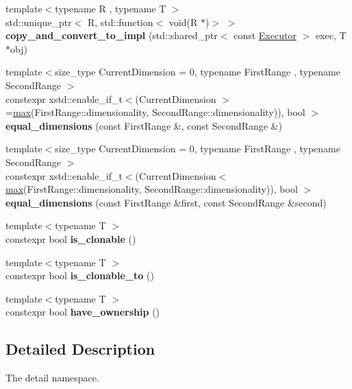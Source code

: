 \begin{DoxyCompactItemize}
{\footnotesize template$<$typename R , typename T $>$ }\\std\+::unique\+\_\+ptr$<$ R, std\+::function$<$ void(R $\ast$)$>$ $>$ {\bfseries copy\+\_\+and\+\_\+convert\+\_\+to\+\_\+impl} (std\+::shared\+\_\+ptr$<$ const \hyperlink{classgko_1_1Executor}{Executor} $>$ exec, T $\ast$obj)
\item 
\mbox{\label{namespacegko_1_1detail_a4f4f7a64773433c299781d012982d34b}} 
{\footnotesize template$<$size\+\_\+type Current\+Dimension = 0, typename First\+Range , typename Second\+Range $>$ }\\constexpr xstd\+::enable\+\_\+if\+\_\+t$<$(Current\+Dimension $>$=\hyperlink{namespacegko_af1812df45c6ec07780d579a12b64c753}{max}(First\+Range\+::dimensionality, Second\+Range\+::dimensionality)), bool $>$ {\bfseries equal\+\_\+dimensions} (const First\+Range \&, const Second\+Range \&)
\item 
\mbox{\label{namespacegko_1_1detail_a10f2b79746f4c9575b3a3ea1a330383d}} 
{\footnotesize template$<$size\+\_\+type Current\+Dimension = 0, typename First\+Range , typename Second\+Range $>$ }\\constexpr xstd\+::enable\+\_\+if\+\_\+t$<$(Current\+Dimension$<$ \hyperlink{namespacegko_af1812df45c6ec07780d579a12b64c753}{max}(First\+Range\+::dimensionality, Second\+Range\+::dimensionality)), bool $>$ {\bfseries equal\+\_\+dimensions} (const First\+Range \&first, const Second\+Range \&second)
\item 
\mbox{\label{namespacegko_1_1detail_a9de2a74f0e4ea4455f3334c53b16941b}} 
{\footnotesize template$<$typename T $>$ }\\constexpr bool {\bfseries is\+\_\+clonable} ()
\item 
\mbox{\label{namespacegko_1_1detail_add0b9257313b2003b4718199e74e3bb0}} 
{\footnotesize template$<$typename T $>$ }\\constexpr bool {\bfseries is\+\_\+clonable\+\_\+to} ()
\item 
\mbox{\label{namespacegko_1_1detail_a254e85dfc109e395a51e47de053c5bb7}} 
{\footnotesize template$<$typename T $>$ }\\constexpr bool {\bfseries have\+\_\+ownership} ()
\end{DoxyCompactItemize}


\subsection{Detailed Description}
The detail namespace. 